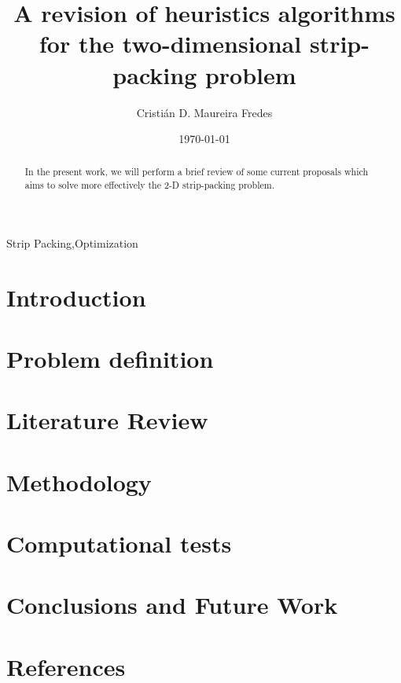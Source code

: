 \documentclass[preprint,authoryear,12pt]{elsarticle}
\begin{document}
\begin{frontmatter}

\title{A revision of heuristics algorithms for the two-dimensional strip-packing problem}
\author[utfsm]{Cristián D. Maureira Fredes}


\address[utfsm]{Departamento de Informática, Universidad Técnica Federico Santa María, Av. España 1680, Valparaiso, Chile}
\date{\today}

\begin{abstract}
In the present work,
we will perform a brief review of some current proposals
which aims to solve more effectively the 2-D strip-packing problem.
\end{abstract}

\begin{keyword}
Strip Packing\sep Optimization
\end{keyword}

\end{frontmatter}

\section{Introduction}
\label{introduction}


\section{Problem definition}
\label{problem}


\section{Literature Review}
\label{stateofart}


\section{Methodology}
\label{methodology}


\section{Computational tests}
\label{tests}


\section{Conclusions and Future Work}
\label{conclusions}


\section*{References}
%


\end{document}
